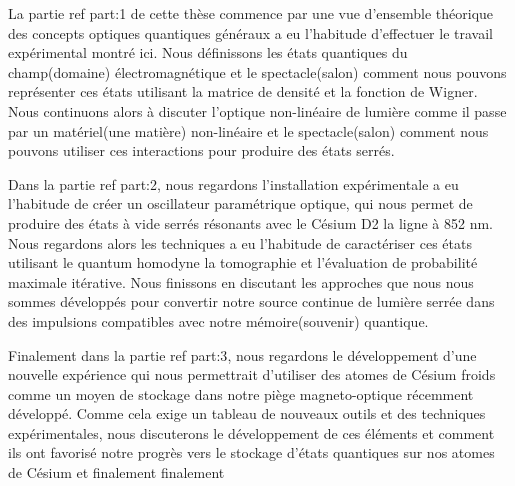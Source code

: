 La partie ref {part:1} de cette thèse commence par une vue d'ensemble théorique des concepts optiques quantiques généraux a eu l'habitude d'effectuer le travail expérimental montré ici. Nous définissons les états quantiques du champ(domaine) électromagnétique et le spectacle(salon) comment nous pouvons représenter ces états utilisant la matrice de densité et la fonction de Wigner. Nous continuons alors à discuter l'optique non-linéaire de lumière comme il passe par un matériel(une matière) non-linéaire et le spectacle(salon) comment nous pouvons utiliser ces interactions pour produire des états serrés.

Dans la partie ref {part:2}, nous regardons l'installation expérimentale a eu l'habitude de créer un oscillateur paramétrique optique, qui nous permet de produire des états à vide serrés résonants avec le Césium D2 la ligne à 852 nm. Nous regardons alors les techniques a eu l'habitude de caractériser ces états utilisant le quantum homodyne la tomographie et l'évaluation de probabilité maximale itérative. Nous finissons en discutant les approches que nous nous sommes développés pour convertir notre source continue de lumière serrée dans des impulsions compatibles avec notre mémoire(souvenir) quantique.

Finalement dans la partie ref {part:3}, nous regardons le développement d'une nouvelle expérience qui nous permettrait d'utiliser des atomes de Césium froids comme un moyen de stockage dans notre piège magneto-optique récemment développé. Comme cela exige un tableau de nouveaux outils et des techniques expérimentales, nous discuterons le développement de ces éléments et comment ils ont favorisé notre progrès vers le stockage d'états quantiques sur nos atomes de Césium et finalement finalement
